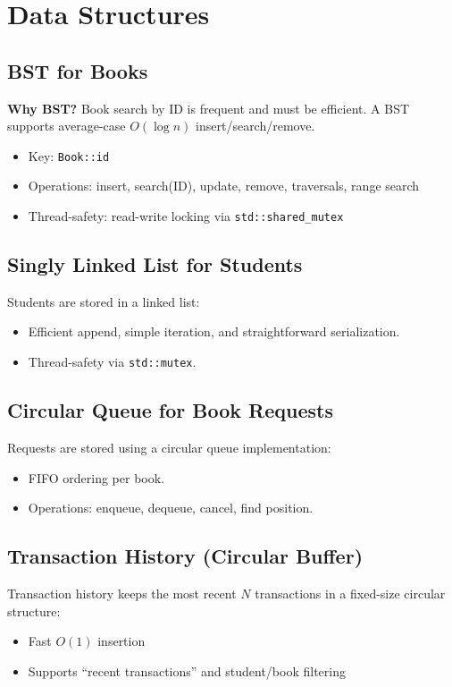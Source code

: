 \documentclass[11pt,a4paper]{article}
\begin{document}
\section{Data Structures}
\subsection{BST for Books}
\textbf{Why BST?} Book search by ID is frequent and must be efficient. A BST supports average-case \(O(\log n)\) insert/search/remove.

\begin{itemize}
  \item Key: \texttt{Book::id}
  \item Operations: insert, search(ID), update, remove, traversals, range search
  \item Thread-safety: read-write locking via \texttt{std::shared\_mutex}
\end{itemize}

\subsection{Singly Linked List for Students}
Students are stored in a linked list:
\begin{itemize}
  \item Efficient append, simple iteration, and straightforward serialization.
  \item Thread-safety via \texttt{std::mutex}.
\end{itemize}

\subsection{Circular Queue for Book Requests}
Requests are stored using a circular queue implementation:
\begin{itemize}
  \item FIFO ordering per book.
  \item Operations: enqueue, dequeue, cancel, find position.
\end{itemize}

\subsection{Transaction History (Circular Buffer)}
Transaction history keeps the most recent \(N\) transactions in a fixed-size circular structure:
\begin{itemize}
  \item Fast \(O(1)\) insertion
  \item Supports ``recent transactions'' and student/book filtering
\end{itemize}
\end{document}
